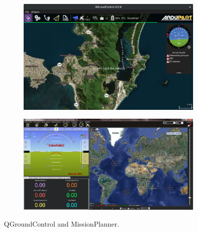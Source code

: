 \begin{figure}[h]
  \centering
  \begin{subfigure}{.8\textwidth}
    \centering
    \includegraphics[width=\linewidth]{figs/qgc.png}
  \end{subfigure}%

  \begin{subfigure}{.8\textwidth}
    \centering
    \includegraphics[width=\linewidth]{figs/missionplanner.png}

  \end{subfigure}
  \caption{QGroundControl and MissionPlanner.}
  \label{fig:motorcurves}
\end{figure}